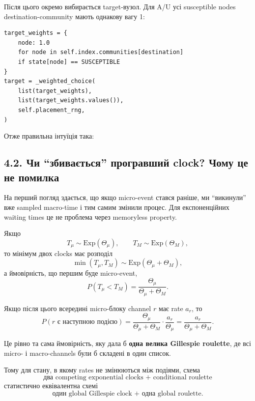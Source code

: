 \documentclass[11pt,a4paper]{article}
\begin{document}
Після цього окремо вибирається target-вузол. Для A/U усі susceptible nodes destination-community мають однакову вагу 1:

\begin{lstlisting}[style=pycode]
target_weights = {
    node: 1.0
    for node in self.index.communities[destination]
    if state[node] == SUSCEPTIBLE
}
target = _weighted_choice(
    list(target_weights),
    list(target_weights.values()),
    self.placement_rng,
)
\end{lstlisting}

Отже правильна інтуїція така:

\begin{center}
\end{center}

\subsection*{4.2. Чи ``збивається'' програвший clock? Чому це не помилка}

На перший погляд здається, що якщо micro-event стався раніше, ми ``викинули'' вже sampled macro-time і тим самим змінили процес. Для експоненційних waiting times це не проблема через memoryless property.

Якщо
\[
T_{\mu}\sim\mathrm{Exp}(\Theta_{\mu}),\qquad
T_M\sim\mathrm{Exp}(\Theta_M),
\]
то мінімум двох clocks має розподіл
\[
\min(T_{\mu},T_M)\sim\mathrm{Exp}(\Theta_{\mu}+\Theta_M),
\]
а ймовірність, що першим буде micro-event,
\[
P(T_{\mu}<T_M)=\frac{\Theta_{\mu}}{\Theta_{\mu}+\Theta_M}.
\]

Якщо після цього всередині micro-блоку channel \(r\) має rate \(a_r\), то
\[
P(r\text{ є наступною подією})
=
\frac{\Theta_{\mu}}{\Theta_{\mu}+\Theta_M}
\cdot
\frac{a_r}{\Theta_{\mu}}
=
\frac{a_r}{\Theta_{\mu}+\Theta_M}.
\]

Це рівно та сама ймовірність, яку дала б \textbf{одна велика Gillespie roulette}, де всі micro- і macro-channels були б складені в один список.

Тому для стану, в якому rates не змінюються між подіями, схема
\[
\boxed{\text{два competing exponential clocks + conditional roulette}}
\]
статистично еквівалентна схемі
\[
\boxed{\text{один global Gillespie clock + одна global roulette}}.
\]
\end{document}
